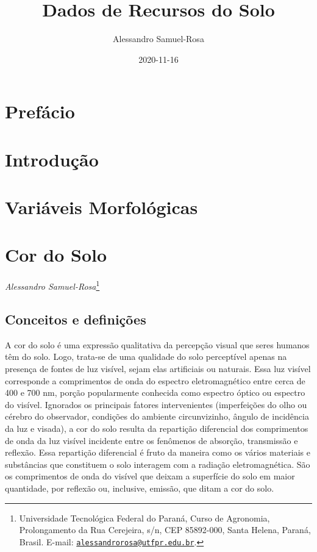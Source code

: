 \documentclass[
]{book}
\title{Dados de Recursos do Solo}
\author{Alessandro Samuel-Rosa}
\date{2020-11-16}
\begin{document}
\maketitle

{
\setcounter{tocdepth}{1}
\tableofcontents
}
\hypertarget{prefuxe1cio}{%
\chapter*{Prefácio}\label{prefuxe1cio}}

\hypertarget{intro}{%
\chapter{Introdução}\label{intro}}

\hypertarget{variuxe1veis-morfoluxf3gicas}{%
\chapter*{Variáveis Morfológicas}\label{variuxe1veis-morfoluxf3gicas}}

\hypertarget{cor-do-solo}{%
\chapter{Cor do Solo}\label{cor-do-solo}}

\emph{Alessandro Samuel-Rosa}\footnote{Universidade Tecnológica Federal do Paraná, Curso de Agronomia, Prolongamento da Rua Cerejeira, s/n, CEP 85892-000, Santa Helena, Paraná, Brasil. E-mail: \href{mailto:alessandrorosa@utfpr.edu.br}{\nolinkurl{alessandrorosa@utfpr.edu.br}}.}

\hypertarget{conceitos-e-definiuxe7uxf5es}{%
\section{Conceitos e definições}\label{conceitos-e-definiuxe7uxf5es}}

A cor do solo é uma expressão qualitativa da percepção visual que seres humanos têm do solo. Logo, trata-se de uma qualidade do solo perceptível apenas na presença de fontes de luz visível, sejam elas artificiais ou naturais. Essa luz visível corresponde a comprimentos de onda do espectro eletromagnético entre cerca de 400 e 700 nm, porção popularmente conhecida como espectro óptico ou espectro do visível. Ignorados os principais fatores intervenientes (imperfeições do olho ou cérebro do observador, condições do ambiente circunvizinho, ângulo de incidência da luz e visada), a cor do solo resulta da repartição diferencial dos comprimentos de onda da luz visível incidente entre os fenômenos de absorção, transmissão e reflexão. Essa repartição diferencial é fruto da maneira como os vários materiais e substâncias que constituem o solo interagem com a radiação eletromagnética. São os comprimentos de onda do visível que deixam a superfície do solo em maior quantidade, por reflexão ou, inclusive, emissão, que ditam a cor do solo.
\end{document}
